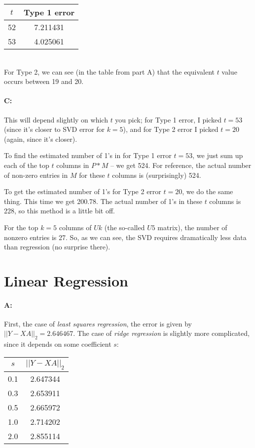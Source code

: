 \documentclass[11pt]{article}
\begin{document}
\begin{tabular}{ | c | c | }
  \hline
  $t$ & Type 1 error \\ 
  \hline
  \hline
  52 & 7.211431 \\ 
  \hline
  53 & 4.025061 \\ 
  \hline
\end{tabular} \\

For Type 2, we can see (in the table from part A) that the equivalent $t$ value occurs between 19 and 20.

\paragraph{C:} This will depend slightly on which $t$ you pick; for Type 1 error, I picked $t = 53$ (since it's closer to SVD error for $k = 5$), and for Type 2 error I picked $t = 20$ (again, since it's closer). 

To find the estimated number of 1's in for Type 1 error $t = 53$, we just sum up each of the top $t$ columns in $P*M$ -- we get 524. For reference, the actual number of non-zero entries in $M$ for these $t$ columns is (surprisingly) 524.

To get the estimated number of 1's for Type 2 error $t = 20$, we do the same thing. This time we get 200.78. The actual number of 1's in these $t$ columns is 228, so this method is a little bit off.

For the top $k = 5$ columns of $Uk$ (the so-called $U5$ matrix), the number of nonzero entries is 27. So, as we can see, the SVD requires dramatically less data than regression (no surprise there).




\section{Linear Regression}

\paragraph{A:} 

First, the case of \textit{least squares regression}, the error is given by $||Y - XA||_2 = 2.646467$. The case of \textit{ridge regression} is slightly more complicated, since it depends on some coefficient $s$:

\begin{tabular}{ | c | c | }
  \hline
  $s$ & $||Y-X A||_2$ \\
  \hline
  \hline
  0.1 & 2.647344 \\ 
  \hline
  0.3 & 2.653911 \\ 
  \hline
  0.5 & 2.665972 \\ 
  \hline
  1.0 & 2.714202 \\ 
  \hline
  2.0 & 2.855114 \\ 
  \hline
\end{tabular}
\end{document}
